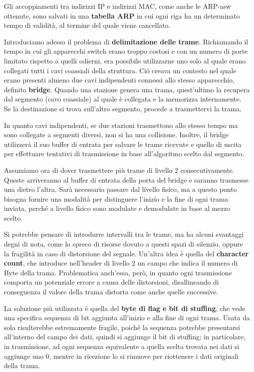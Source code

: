 \noindent Gli accoppiamenti tra indirizzi IP e indirizzi MAC, come anche le ARP-asw ottenute, sono salvati in una \textbf{tabella ARP} in cui ogni
riga ha un determinato tempo di validità, al termine del quale viene cancellato.\par
Introduciamo adesso il problema di \textbf{delimitazione delle trame}. Richiamando il tempo in cui gli apparecchi switch erano troppo costosi e con un
numero di porte limitato rispetto a quelli odierni, era possibile utilizzarne uno solo al quale erano collegati tutti i cavi coassiali della struttura.
Ciò creava un contesto nel quale erano presenti almeno due cavi indipendenti connessi allo stesso apparecchio, definito \textbf{bridge}. Quando una
stazione genera una trama, quest'ultimo la recupera dal segmento (cavo coassiale) al quale è collegata e la memorizza internamente. Se la destinazione
si trova sull'altro segmento, procede a trasmettervi la trama.\par
In quanto cavi indipendenti, se due stazioni trasmettono allo stesso tempo ma sono collegate a segmenti diversi, non si ha una collisione. Inoltre, il
bridge utilizzerà il suo buffer di entrata per salvare le trame ricevute e quello di uscita per effettuare tentativi di trasmissione in base
all'algoritmo scelto dal segmento.\newline

\noindent Assumiamo ora di dover trasmettere più trame di livello 2 consecutivamente. Queste arriveranno al buffer di entrata della porta del bridge e
saranno trasmesse una dietro l'altra. Sarà necessario passare dal livello fisico, ma a questo punto bisogna fornire una modalità per distinguere
l'inizio e la fine di ogni trama inviata, perché a livello fisico sono modulate e demodulate in base al mezzo scelto.\par
Si potrebbe pensare di introdurre intervalli tra le trame, ma ha alcuni svantaggi degni di nota, come lo spreco di risorse dovuto a questi spazi di
silenzio, oppure la fragilità in caso di distorsione del segnale. Un'altra idea è quella del \textbf{character count}, che introduce nell'header di
livello 2 un campo che indica il numero di Byte della trama. Problematica anch'essa, però, in quanto ogni trasmissione comporta un potenziale errore a
causa delle distorsioni, disallineando di conseguenza il valore della trama distorta come anche quelle successive.\par
La soluzione più utilizzata è quella del \textbf{byte di flag e bit di stuffing}, che vede una specifica sequenza di bit aggiunta all'inizio e alla fine
di ogni trama. Usata da sola risulterebbe estremamente fragile, poiché la sequenza potrebbe presentarsi all'interno del campo dei dati, quindi si
aggiunge il bit di stuffing; in particolare, in trasmissione, ad ogni sequenza equivalente a quella scelta trovata nei dati si aggiunge uno $0$, mentre
in ricezione lo si rimuove per riottenere i dati originali della trama.

